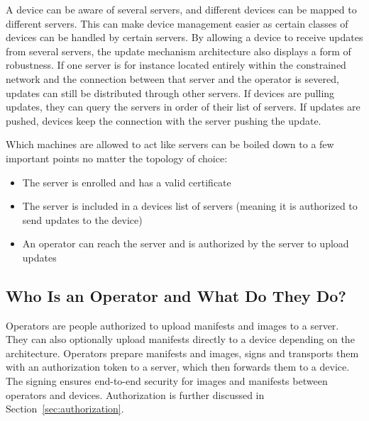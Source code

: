 \documentclass[0-thesis.tex]{subfiles}
\begin{document}
A device can be aware of several servers, and different devices can be mapped to different
servers. This can make device management easier as certain classes of devices can be
handled by certain servers. By allowing a device to receive updates from several servers,
the update mechanism architecture also displays a form of robustness. If one server is for
instance located entirely within the constrained network and the connection between that
server and the operator is severed, updates can still be distributed through other
servers. If devices are pulling updates, they can query the servers in order of their list
of servers. If updates are pushed, devices keep the connection with the server pushing the
update.

Which machines are allowed to act like servers can be boiled down to a few important
points no matter the topology of choice:

\begin{itemize}
    \item The server is enrolled and has a valid certificate
    \item The server is included in a devices list of servers (meaning it is authorized to
            send updates to the device)
    \item An operator can reach the server and is authorized by the server to upload
            updates
\end{itemize}

\subsection{Who Is an Operator and What Do They Do?}
\label{ssec:who-is-an-operator}
Operators are people authorized to upload manifests and images to a server. They can also
optionally upload manifests directly to a device depending on the architecture. Operators
prepare manifests and images, signs and transports them with an authorization token to a
server, which then forwards them to a device. The signing ensures end-to-end security for
images and manifests between operators and devices. Authorization is further discussed in
Section~\ref{sec:authorization}.
\end{document}
